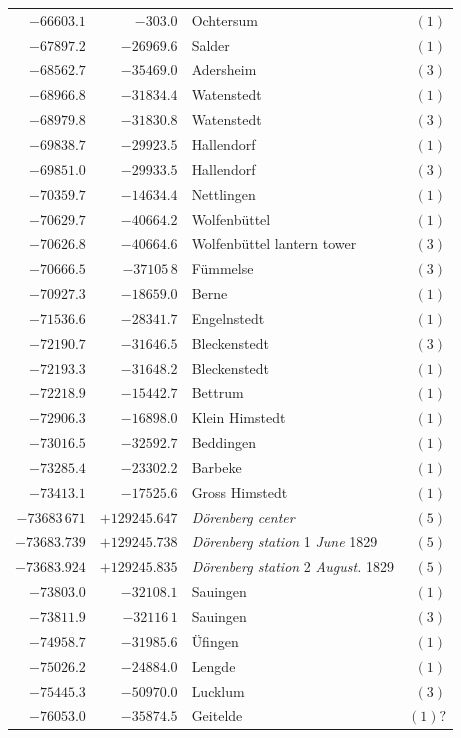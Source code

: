 \begin{center}
\begin{tabular}{r|r|p{170pt}|r}
\(-66603.1\)&\(-303.0\)&Ochtersum&\((1)\)\\
\(-67897.2\)&\(-26969.6\)&Salder&\((1)\)\\
\(-68562.7\)&\(-35469.0\)&Adersheim&\((3)\)\\
\(-68966.8\)&\(-31834.4\)&Watenstedt&\((1)\)\\
\(-68979.8\)&\(-31830.8\)&Watenstedt&\((3)\)\\
\(-69838.7\)&\(-29923.5\)&Hallendorf&\((1)\)\\
\(-69851.0\)&\(-29933.5\)&Hallendorf&\((3)\)\\
\(-70359.7\)&\(-14634.4\)&Nettlingen&\((1)\)\\
\(-70629.7\)&\(-40664.2\)&Wolfenbüttel&\((1)\)\\
\(-70626.8\)&\(-40664.6\)&Wolfenbüttel lantern tower&\((3)\)\\
\(-70666.5\)&\(-37105\,8\)&Fümmelse&\((3)\)\\
\(-70927.3\)&\(-18659.0\)&Berne&\((1)\)\\
\(-71536.6\)&\(-28341.7\)&Engelnstedt&\((1)\)\\
\(-72190.7\)&\(-31646.5\)&Bleckenstedt&\((3)\)\\
\(-72193.3\)&\(-31648.2\)&Bleckenstedt&\((1)\)\\
\(-72218.9\)&\(-15442.7\)&Bettrum&\((1)\)\\
\(-72906.3\)&\(-16898.0\)&Klein Himstedt&\((1)\)\\
\(-73016.5\)&\(-32592.7\)&Beddingen&\((1)\)\\
\(-73285.4\)&\(-23302.2\)&Barbeke&\((1)\)\\
\(-73413.1\)&\(-17525.6\)&Gross Himstedt&\((1)\)\\
\(-73683\,671\)&\(+129245.647\)&\textit{Dörenberg center}&\((5)\)\\
\(-73683.739\)&\(+129245.738\)&\textit{Dörenberg station} 1 \textit{June} 1829&\((5)\)\\
\(-73683.924\)&\(+129245.835\)&\textit{Dörenberg station} 2 \textit{August.} 1829&\((5)\)\\
\(-73803.0\)&\(-32108.1\)&Sauingen&\((1)\)\\
\(-73811.9\)&\(-32116\,1\)&Sauingen&\((3)\)\\
\(-74958.7\)&\(-31985.6\)&Üfingen&\((1)\)\\
\(-75026.2\)&\(-24884.0\)&Lengde&\((1)\)\\
\(-75445.3\)&\(-50970.0\)&Lucklum&\((3)\)\\
\(-76053.0\)&\(-35874.5\)&Geitelde&\((1)?\)\\
\hline\end{tabular}\endgroup\end{center}
